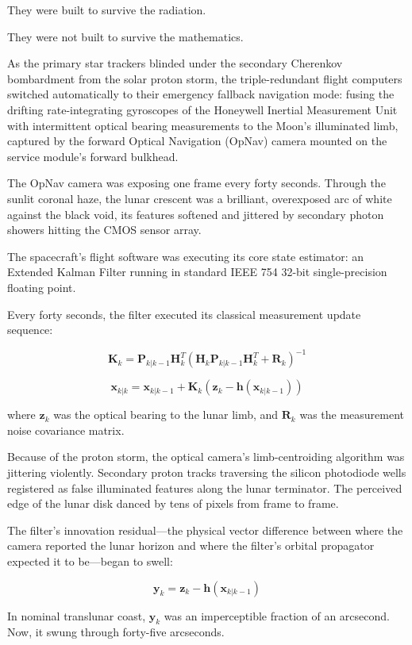 \documentclass[12pt,twoside,openright]{book}
\begin{document}
They were built to survive the radiation.

They were not built to survive the mathematics.

As the primary star trackers blinded under the secondary Cherenkov
bombardment from the solar proton storm, the triple-redundant flight
computers switched automatically to their emergency fallback navigation
mode: fusing the drifting rate-integrating gyroscopes of the Honeywell
Inertial Measurement Unit with intermittent optical bearing measurements
to the Moon's illuminated limb, captured by the forward Optical
Navigation (OpNav) camera mounted on the service module's forward
bulkhead.

The OpNav camera was exposing one frame every forty seconds. Through the
sunlit coronal haze, the lunar crescent was a brilliant, overexposed arc
of white against the black void, its features softened and jittered by
secondary photon showers hitting the CMOS sensor array.

The spacecraft's flight software was executing its core state estimator:
an Extended Kalman Filter running in standard IEEE 754 32-bit
single-precision floating point.

Every forty seconds, the filter executed its classical measurement
update sequence:

\[\mathbf{K}_k = \mathbf{P}_{k|k-1} \mathbf{H}_k^T \left( \mathbf{H}_k \mathbf{P}_{k|k-1} \mathbf{H}_k^T + \mathbf{R}_k \right)^{-1}\]

\[\mathbf{x}_{k|k} = \mathbf{x}_{k|k-1} + \mathbf{K}_k (\mathbf{z}_k - \mathbf{h}(\mathbf{x}_{k|k-1}))\]

where \(\mathbf{z}_k\) was the optical bearing to the lunar limb, and
\(\mathbf{R}_k\) was the measurement noise covariance matrix.

Because of the proton storm, the optical camera's limb-centroiding
algorithm was jittering violently. Secondary proton tracks traversing
the silicon photodiode wells registered as false illuminated features
along the lunar terminator. The perceived edge of the lunar disk danced
by tens of pixels from frame to frame.

The filter's innovation residual---the physical vector difference
between where the camera reported the lunar horizon and where the
filter's orbital propagator expected it to be---began to swell:

\[\mathbf{y}_k = \mathbf{z}_k - \mathbf{h}(\mathbf{x}_{k|k-1})\]

In nominal translunar coast, \(\mathbf{y}_k\) was an imperceptible
fraction of an arcsecond. Now, it swung through forty-five arcseconds.
\end{document}
